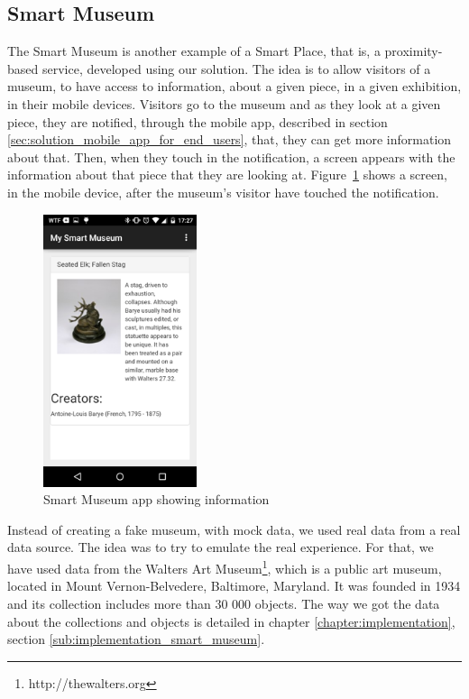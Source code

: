 \subsection{Smart Museum}
\label{sub:smart_museum}
The Smart Museum is another example of a Smart Place, that is, a proximity-based service, developed using our solution.
The idea is to allow visitors of a museum, to have access to information, about a given piece, in a given exhibition, in their mobile devices.
Visitors go to the museum and as they look at a given piece, they are notified, through the mobile app, described in section \ref{sec:solution_mobile_app_for_end_users}, that, they can get more information about that.
Then, when they touch in the notification, a screen appears with the information about that piece that they are looking at.
Figure~\ref{fig:smart_museum_app} shows a screen, in the mobile device, after the museum's visitor have touched the notification.

\begin{figure}[!ht]
  \centering
    \includegraphics[width=0.4\textwidth, keepaspectratio]{images/screenshots/smart_museum_app}
    \caption[Smart Museum]{Smart Museum app showing information}
    \label{fig:smart_museum_app}
\end{figure}

Instead of creating a fake museum, with mock data, we used real data from a real data source.
The idea was to try to emulate the real experience.
For that, we have used data from the Walters Art Museum\footnote{http://thewalters.org}, which is a public art museum, located in Mount Vernon-Belvedere, Baltimore, Maryland.
It was founded in 1934 and its collection includes more than 30 000 objects.
The way we got the data about the collections and objects is detailed in chapter \ref{chapter:implementation}, section \ref{sub:implementation_smart_museum}.
